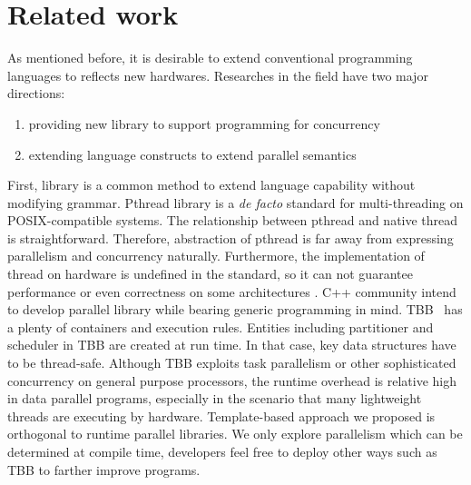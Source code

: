 \section{Related work}
As mentioned before, it is desirable to extend conventional programming languages to reflects new hardwares. Researches in the field have two major directions:
\begin{enumerate}
\item providing new library to support programming for concurrency
\item extending language constructs to extend parallel semantics
\end{enumerate}

First, library is a common method to extend language capability
without modifying grammar. Pthread library is a \textit{de facto} standard for
multi-threading on POSIX-compatible systems. The relationship between
pthread and native thread is straightforward. Therefore, abstraction
of pthread is far away from expressing parallelism and concurrency
naturally. Furthermore, the implementation of thread on hardware is
undefined in the standard, so it can not guarantee performance or even
correctness on some architectures \cite{Boehm05}. C++ community intend to develop parallel library while bearing
generic programming in mind. TBB~\cite{tbb} has a plenty of
containers and execution rules. Entities including partitioner and
scheduler in TBB are created at run time. In that case, key data
structures have to be thread-safe. Although TBB exploits task
parallelism or other sophisticated concurrency on general purpose
processors, the runtime overhead is relative high in data parallel
programs, especially in the scenario that many lightweight threads are
executing by hardware. Template-based approach we proposed is orthogonal to runtime parallel
libraries. We only explore parallelism which can be determined at
compile time, developers feel free to deploy other ways such as TBB to
farther improve programs.
 


